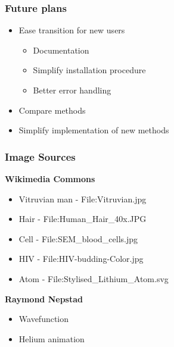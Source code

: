 \documentclass{beamer}
\begin{document}
\begin{frame}
	\frametitle{Future plans}
	
	\begin{itemize}
		\item<1-> Ease transition for new users
			\begin{itemize}
				\item<2-> Documentation
				\item<3-> Simplify installation procedure
				\item<4-> Better error handling
			\end{itemize}
		\item<5-> Compare methods
		\item<6-> Simplify implementation of new methods
	\end{itemize}
\end{frame}



\begin{frame}
	\frametitle{Image Sources}

	\textbf{Wikimedia Commons}
	\begin{itemize}
		\item Vitruvian man - File:Vitruvian.jpg
		\item Hair - File:Human\_Hair\_40x.JPG
		\item Cell - File:SEM\_blood\_cells.jpg
		\item HIV - File:HIV-budding-Color.jpg
		\item Atom - File:Stylised\_Lithium\_Atom.svg
	\end{itemize}

	\textbf{Raymond Nepstad}
	\begin{itemize}
		\item Wavefunction
		\item Helium animation
	\end{itemize}
	
\end{frame}
\end{document}
